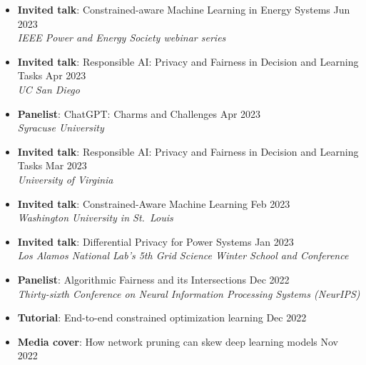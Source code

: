 \begin{itemize}
  \item {\bf Invited talk}: {Constrained-aware Machine Learning in Energy Systems} \hfill{Jun 2023}\\
  {\em  IEEE Power and Energy Society webinar series}

  \item {\bf Invited talk}: {Responsible AI: Privacy and Fairness in Decision and Learning Tasks} \hfill{Apr 2023}\\
  {\em  UC San Diego}

  \item {\bf Panelist}: {ChatGPT: Charms and Challenges} \hfill{Apr 2023}\\
  {\em  Syracuse University}

  \item {\bf Invited talk}: {Responsible AI: Privacy and Fairness in Decision and Learning Tasks} \hfill{Mar 2023}\\
  {\em  University of Virginia}

  \item {\bf Invited talk}: {Constrained-Aware Machine Learning} \hfill{Feb 2023}\\
  {\em  Washington University in St.~Louis}

  \item {\bf Invited talk}: {Differential Privacy for Power Systems} \hfill{Jan 2023}\\
  {\em  Los Alamos National Lab's 5th Grid Science Winter School and Conference}

  \item {\bf Panelist}: {Algorithmic Fairness and its Intersections} \hfill{Dec 2022}\\
  {\em Thirty-sixth Conference on Neural Information Processing Systems (NeurIPS)}

  \item {\bf Tutorial}: {End-to-end constrained optimization learning} \hfill{Dec 2022}\\

  \item {\bf Media cover}: 
  {How network pruning can skew deep learning models} \hfill {Nov 2022}\\ 
  ~
  ~
  ~


\end{itemize}
